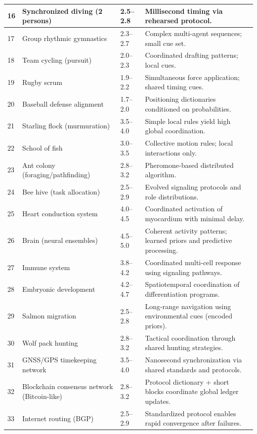 \documentclass[13pt,a4paper]{article}
\begin{document}
\begin{longtable}{|p{0.8cm}|p{6.2cm}|p{3.0cm}|p{5.7cm}|}
		\hline
		16 & Synchronized diving (2 persons) & 2.5--2.8 & Millisecond timing via rehearsed protocol. \\
		\hline
		17 & Group rhythmic gymnastics & 2.3--2.7 & Complex multi-agent sequences; small cue set. \\
		\hline
		18 & Team cycling (pursuit) & 2.0--2.3 & Coordinated drafting patterns; local cues. \\
		\hline
		19 & Rugby scrum & 1.9--2.2 & Simultaneous force application; shared timing cues. \\
		\hline
		20 & Baseball defense alignment & 1.7--2.0 & Positioning dictionaries conditioned on probabilities. \\
		\hline
		21 & Starling flock (murmuration) & 3.5--4.0 & Simple local rules yield high global coordination. \\
		\hline
		22 & School of fish & 3.0--3.5 & Collective motion rules; local interactions only. \\
		\hline
		23 & Ant colony (foraging/pathfinding) & 2.8--3.2 & Pheromone-based distributed algorithm. \\
		\hline
		24 & Bee hive (task allocation) & 2.5--2.9 & Evolved signaling protocols and role distributions. \\
		\hline
		25 & Heart conduction system & 4.0--4.5 & Coordinated activation of myocardium with minimal delay. \\
		\hline
		26 & Brain (neural ensembles) & 4.5--5.0 & Coherent activity patterns; learned priors and predictive processing. \\
		\hline
		27 & Immune system & 3.8--4.2 & Coordinated multi-cell response using signaling pathways. \\
		\hline
		28 & Embryonic development & 4.2--4.7 & Spatiotemporal coordination of differentiation programs. \\
		\hline
		29 & Salmon migration & 2.5--2.8 & Long-range navigation using environmental cues (encoded priors). \\
		\hline
		30 & Wolf pack hunting & 2.8--3.2 & Tactical coordination through shared hunting strategies. \\
		\hline
		31 & GNSS/GPS timekeeping network & 3.5--4.0 & Nanosecond synchronization via shared standards and protocols. \\
		\hline
		32 & Blockchain consensus network (Bitcoin-like) & 2.8--3.2 & Protocol dictionary + short blocks coordinate global ledger updates. \\
		\hline
		33 & Internet routing (BGP) & 2.5--2.9 & Standardized protocol enables rapid convergence after failures. \\

\end{longtable}
\end{document}
